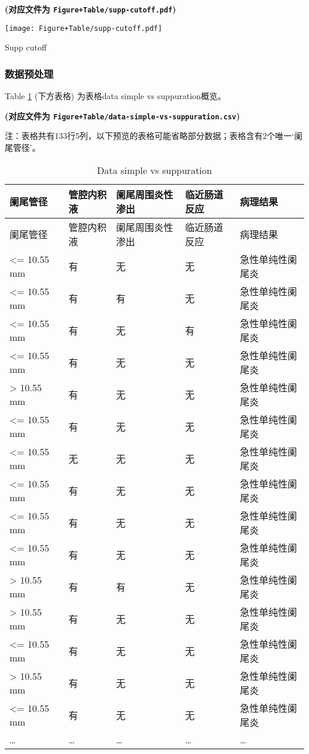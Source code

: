 \documentclass[
]{article}
\begin{document}
\textbf{(对应文件为 \texttt{Figure+Table/supp-cutoff.pdf})}

\def\@captype{figure}
\begin{center}
\texttt{[image: Figure+Table/supp-cutoff.pdf]}
\caption{Supp cutoff}\label{fig:supp-cutoff}
\end{center}

\hypertarget{ux6570ux636eux9884ux5904ux7406}{%
\subsubsection{数据预处理}\label{ux6570ux636eux9884ux5904ux7406}}

Table \ref{tab:data-simple-vs-suppuration} (下方表格) 为表格data simple vs suppuration概览。

\textbf{(对应文件为 \texttt{Figure+Table/data-simple-vs-suppuration.csv})}

\begin{center}\begin{tcolorbox}[colback=gray!10, colframe=gray!50, width=0.9\linewidth, arc=1mm, boxrule=0.5pt]注：表格共有133行5列，以下预览的表格可能省略部分数据；表格含有2个唯一`阑尾管径'。
\end{tcolorbox}
\end{center}

\begin{longtable}[]{@{}lllll@{}}
\caption{\label{tab:data-simple-vs-suppuration}Data simple vs suppuration}\tabularnewline
\toprule
阑尾管径 & 管腔内积液 & 阑尾周围炎性渗出 & 临近肠道反应 & 病理结果\tabularnewline
\midrule
\endfirsthead
\toprule
阑尾管径 & 管腔内积液 & 阑尾周围炎性渗出 & 临近肠道反应 & 病理结果\tabularnewline
\midrule
\endhead
\textless= 10.55 mm & 有 & 无 & 无 & 急性单纯性阑尾炎\tabularnewline
\textless= 10.55 mm & 有 & 有 & 无 & 急性单纯性阑尾炎\tabularnewline
\textless= 10.55 mm & 有 & 无 & 有 & 急性单纯性阑尾炎\tabularnewline
\textless= 10.55 mm & 有 & 无 & 无 & 急性单纯性阑尾炎\tabularnewline
\textgreater{} 10.55 mm & 有 & 无 & 无 & 急性单纯性阑尾炎\tabularnewline
\textless= 10.55 mm & 有 & 无 & 无 & 急性单纯性阑尾炎\tabularnewline
\textless= 10.55 mm & 无 & 无 & 无 & 急性单纯性阑尾炎\tabularnewline
\textless= 10.55 mm & 有 & 无 & 无 & 急性单纯性阑尾炎\tabularnewline
\textless= 10.55 mm & 有 & 无 & 无 & 急性单纯性阑尾炎\tabularnewline
\textless= 10.55 mm & 有 & 无 & 无 & 急性单纯性阑尾炎\tabularnewline
\textgreater{} 10.55 mm & 有 & 有 & 无 & 急性单纯性阑尾炎\tabularnewline
\textgreater{} 10.55 mm & 有 & 无 & 无 & 急性单纯性阑尾炎\tabularnewline
\textless= 10.55 mm & 有 & 无 & 无 & 急性单纯性阑尾炎\tabularnewline
\textgreater{} 10.55 mm & 有 & 无 & 无 & 急性单纯性阑尾炎\tabularnewline
\textless= 10.55 mm & 有 & 无 & 无 & 急性单纯性阑尾炎\tabularnewline
\ldots{} & \ldots{} & \ldots{} & \ldots{} & \ldots{}\tabularnewline
\bottomrule
\end{longtable}
\end{document}
